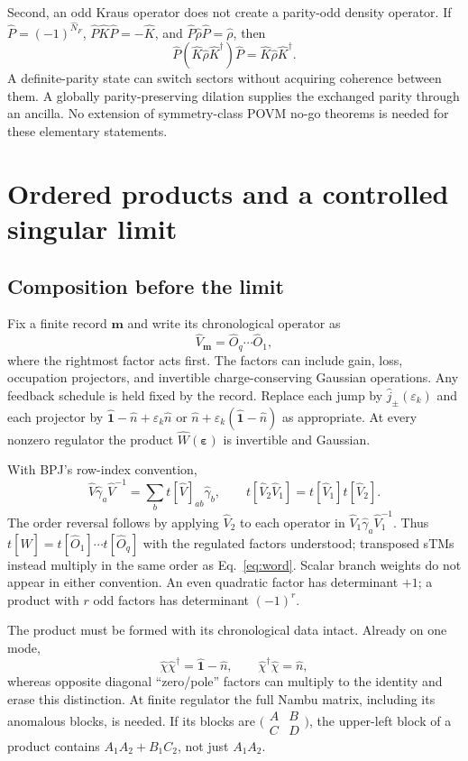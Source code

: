\documentclass[aps,prb,onecolumn,nofootinbib,superscriptaddress]{revtex4-2}
\newcommand{\One}{\hat{\mathbf{1}}}
\newcommand{\eps}{\varepsilon}
\begin{document}
Second, an odd Kraus operator does not create a parity-odd density
operator. If $\hat P=(-1)^{\hat N_F}$, $\hat P\hat K\hat P=-\hat K$, and
$\hat P\hat\rho\hat P=\hat\rho$, then
\begin{equation}
 \hat P(\hat K\hat\rho\hat K^\dagger)\hat P
 =\hat K\hat\rho\hat K^\dagger.
 \label{eq:parity}
\end{equation}
A definite-parity state can switch sectors without acquiring coherence
between them. A globally parity-preserving dilation supplies the exchanged
parity through an ancilla. No extension of symmetry-class POVM no-go
theorems is needed for these elementary statements.

\section{Ordered products and a controlled singular limit}
\subsection{Composition before the limit}
Fix a finite record $\boldsymbol m$ and write its chronological operator
as
\begin{equation}
 \hat V_{\boldsymbol m}=\hat O_q\cdots\hat O_1,
 \label{eq:word}
\end{equation}
where the rightmost factor acts first. The factors can include gain,
loss, occupation projectors, and invertible charge-conserving Gaussian
operations. Any feedback schedule is held fixed by the record.
Replace each jump by $\hat j_\pm(\eps_k)$ and each projector by
$\One-\hat n+\eps_k\hat n$ or
$\hat n+\eps_k(\One-\hat n)$ as appropriate. At every nonzero regulator
the product $\hat W(\bm\eps)$ is invertible and Gaussian.

With BPJ's row-index convention,
\begin{equation}
 \hat V\hat\gamma_a\hat V^{-1}=\sum_b t[\hat V]_{ab}\hat\gamma_b,
 \qquad
 t[\hat V_2\hat V_1]=t[\hat V_1]t[\hat V_2].
 \label{eq:order}
\end{equation}
The order reversal follows by applying $\hat V_2$ to each operator in
$\hat V_1\hat\gamma_a\hat V_1^{-1}$. Thus $t[\hat W]=t[\hat O_1]\cdots
t[\hat O_q]$ with the regulated factors understood; transposed sTMs
instead multiply in the same order as Eq.~\eqref{eq:word}. Scalar branch
weights do not appear in either convention. An even quadratic factor has
determinant $+1$; a product with $r$ odd factors has determinant $(-1)^r$.

The product must be formed with its chronological data intact. Already
on one mode,
\begin{equation}
 \hat\chi\hat\chi^\dagger=\One-\hat n,\qquad
 \hat\chi^\dagger\hat\chi=\hat n,
 \label{eq:order-example}
\end{equation}
whereas opposite diagonal ``zero/pole'' factors can multiply to the
identity and erase this distinction. At finite regulator the full Nambu
matrix, including its anomalous blocks, is needed. If its blocks are
$\bigl(\begin{smallmatrix}A&B\\C&D\end{smallmatrix}\bigr)$, the upper-left
block of a product contains $A_1A_2+B_1C_2$, not just $A_1A_2$.
\end{document}
